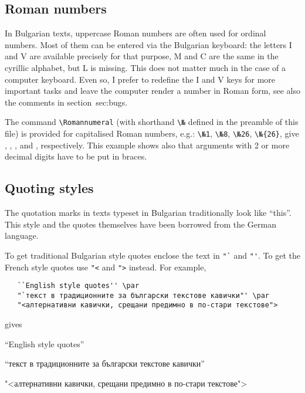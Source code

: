 \documentclass[12pt,a4paper,twosided]{article}
\def\№{\Romannumeral}
\begin{document}


\subsection{Roman numbers}

In Bulgarian texts, uppercase Roman numbers are often used for ordinal
numbers. Most of them can be entered via the Bulgarian keyboard: the letters I and V are
available precisely for that purpose, M and C are the same in the cyrillic alphabet, but L is
missing. This does not matter much in the case of a computer keyboard. Even so,   I prefer to
redefine the I and V keys for more important tasks and leave the computer render a number in
Roman form, see also the comments in section~{sec:bugs}. 

The command \verb+\Romannumeral+ (with shorthand \verb+\№+ defined in the preamble of this
file) is provided for capitalised Roman numbers, e.g.: 
\verb+\№1+, 
\verb+\№8+, 
\verb+\№26+, 
\verb+\№{26}+,
give
\№1, \№8, \№26, and \№{26},
respectively. This example shows also that arguments with 2 or more decimal digits have to be
put in braces.


\subsection{Quoting styles}

The quotation marks in texts typeset in Bulgarian traditionally look like "`this"'. 
This style and the quotes themselves have been borrowed from the German language.

To get traditional Bulgarian style quotes enclose the text in \verb+"`+ and \verb+"'+. 
To get the French style quotes use \verb+"<+ and \verb+">+ instead. For example,

\begin{verbatim}
   ``English style quotes'' \par
   "`текст в традиционните за български текстове кавички"' \par
   "<алтернативни кавички, срещани предимно в по-стари текстове">
\end{verbatim}

\noindent
gives

\bigskip{}

   ``English style quotes'' \par
   "`текст в традиционните за български текстове кавички"' \par
   "<алтернативни кавички, срещани предимно в по-стари текстове">
\end{document}
